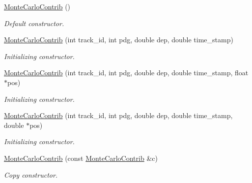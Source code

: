 \begin{DoxyCompactItemize}
\item 
\hyperlink{class_d_d4hep_1_1_simulation_1_1_geant4_hit_data_1_1_monte_carlo_contrib_a1c645716d88f4e36bd62b9ad374808ee}{MonteCarloContrib} ()
\begin{DoxyCompactList}\small\item\em Default constructor. \item\end{DoxyCompactList}\item 
\hyperlink{class_d_d4hep_1_1_simulation_1_1_geant4_hit_data_1_1_monte_carlo_contrib_a1ae337705c3b25f0ba9521d4be0b009c}{MonteCarloContrib} (int track\_\-id, int pdg, double dep, double time\_\-stamp)
\begin{DoxyCompactList}\small\item\em Initializing constructor. \item\end{DoxyCompactList}\item 
\hyperlink{class_d_d4hep_1_1_simulation_1_1_geant4_hit_data_1_1_monte_carlo_contrib_a52279e49adb2ef0be6fde7fdbf43d57f}{MonteCarloContrib} (int track\_\-id, int pdg, double dep, double time\_\-stamp, float $\ast$pos)
\begin{DoxyCompactList}\small\item\em Initializing constructor. \item\end{DoxyCompactList}\item 
\hyperlink{class_d_d4hep_1_1_simulation_1_1_geant4_hit_data_1_1_monte_carlo_contrib_ac8d6f1ef4bbb713c2f7a1ee10230450e}{MonteCarloContrib} (int track\_\-id, int pdg, double dep, double time\_\-stamp, double $\ast$pos)
\begin{DoxyCompactList}\small\item\em Initializing constructor. \item\end{DoxyCompactList}\item 
\hyperlink{class_d_d4hep_1_1_simulation_1_1_geant4_hit_data_1_1_monte_carlo_contrib_a71e9bcc92b1997f224426aa7418f452c}{MonteCarloContrib} (const \hyperlink{class_d_d4hep_1_1_simulation_1_1_geant4_hit_data_1_1_monte_carlo_contrib}{MonteCarloContrib} \&c)
\begin{DoxyCompactList}\small\item\em Copy constructor. \item\end{DoxyCompactList}\item 

\end{DoxyCompactItemize}
